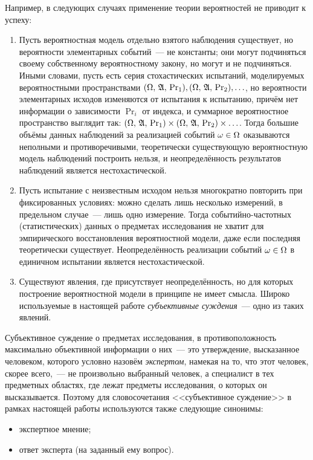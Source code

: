 Например, в следующих случаях применение теории вероятностей не приводит к успеху:
\begin{enumerate}
  \item Пусть вероятностная модель отдельно взятого наблюдения существует, но вероятности элементарных событий~--- не константы; они могут  подчиняться своему собственному вероятностному закону, но могут и не подчиняться. Иными словами, пусть есть серия стохастических испытаний, моделируемых вероятностными пространствами ${(\Omega,\, {\mathfrak{A}},\,{\mathrm{Pr}}_{1})}, {(\Omega,\, {\mathfrak{A}},\,{\mathrm{Pr}}_{2})}, \ldots$, но вероятности элементарных исходов изменяются от испытания к испытанию, причём нет информации о зависимости $\Pr_{i}$ от индекса, и суммарное вероятностное пространство выглядит так: ${(\Omega,\, {\mathfrak{A}},\,{\mathrm{Pr}}_{1})} \times {(\Omega,\, {\mathfrak{A}},\,{\mathrm{Pr}}_{2})} \times \ldots$. Тогда большие объёмы данных наблюдений за реализацией событий $\omega \in \Omega$ оказываются неполными и противоречивыми, теоретически существующую вероятностную модель наблюдений построить нельзя, и неопределённость результатов наблюдений является нестохастической. 
  \item Пусть испытание с неизвестным исходом нельзя многократно повторить при фиксированных условиях: можно сделать лишь несколько измерений, в предельном случае~--- лишь одно измерение. Тогда событийно-частотных (статистических) данных о предметах исследования не хватит для эмпирического восстановления вероятностной модели, даже если последняя теоретически существует. Неопределённость реализации событий $\omega \in \Omega$ в единичном испытании является нестохастической. 
  \item {}Существуют явления, где присутствует неопределённость, но для которых построение вероятностной модели в принципе не имеет смысла. Широко используемые в настоящей работе {\sl субъективные суждения}~--- одно из таких явлений. 
\end{enumerate} 

Субъективное суждение о предметах исследования, в противоположность максимально объективной информации о них~--- это утверждение, высказанное человеком, которого  условно назовём {\sl экспертом}, намекая на то, что этот человек, скорее всего,~--- не произвольно выбранный человек, а специалист в тех предметных областях, где лежат предметы исследования, о которых он высказывается. Поэтому для словосочетания <<субъективное суждение>> в рамках настоящей работы используются также следующие синонимы: 
\begin{itemize}
	\item экспертное мнение;
	\item ответ эксперта (на заданный ему вопрос). 
 \end{itemize}
 
